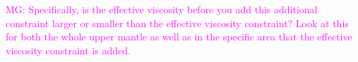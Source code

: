\documentclass[12pt]{article}
\newcommand{\mgnote}[1]{\textcolor{magenta}{MG: #1}}
\begin{document}
{%



\mgnote{Specifically, is the effective viscosity before you add this additional constraint larger or smaller than the effective viscosity constraint? Look at this for both the whole upper mantle as well as in the specific area that the effective viscosity constraint is added.}



 
}
\end{document}

